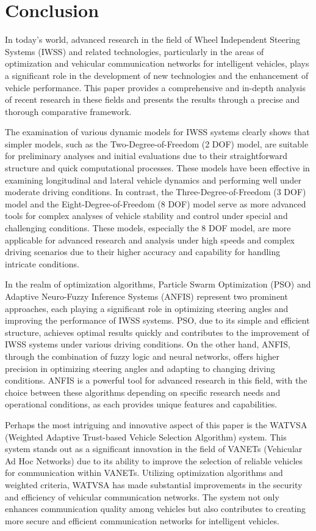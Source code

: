 \documentclass[a4paper,10pt]{article}
\begin{document}
    \section{Conclusion}

        In today's world, advanced research in the field of Wheel Independent Steering Systems (IWSS) and related technologies, particularly in the areas of optimization and vehicular communication networks for intelligent vehicles, plays a significant role in the development of new technologies and the enhancement of vehicle performance. This paper provides a comprehensive and in-depth analysis of recent research in these fields and presents the results through a precise and thorough comparative framework.

        The examination of various dynamic models for IWSS systems clearly shows that simpler models, such as the Two-Degree-of-Freedom (2 DOF) model, are suitable for preliminary analyses and initial evaluations due to their straightforward structure and quick computational processes. These models have been effective in examining longitudinal and lateral vehicle dynamics and performing well under moderate driving conditions. In contrast, the Three-Degree-of-Freedom (3 DOF) model and the Eight-Degree-of-Freedom (8 DOF) model serve as more advanced tools for complex analyses of vehicle stability and control under special and challenging conditions. These models, especially the 8 DOF model, are more applicable for advanced research and analysis under high speeds and complex driving scenarios due to their higher accuracy and capability for handling intricate conditions.
    
        In the realm of optimization algorithms, Particle Swarm Optimization (PSO) and Adaptive Neuro-Fuzzy Inference Systems (ANFIS) represent two prominent approaches, each playing a significant role in optimizing steering angles and improving the performance of IWSS systems. PSO, due to its simple and efficient structure, achieves optimal results quickly and contributes to the improvement of IWSS systems under various driving conditions. On the other hand, ANFIS, through the combination of fuzzy logic and neural networks, offers higher precision in optimizing steering angles and adapting to changing driving conditions. ANFIS is a powerful tool for advanced research in this field, with the choice between these algorithms depending on specific research needs and operational conditions, as each provides unique features and capabilities.
    
        Perhaps the most intriguing and innovative aspect of this paper is the WATVSA (Weighted Adaptive Trust-based Vehicle Selection Algorithm) system. This system stands out as a significant innovation in the field of VANETs (Vehicular Ad Hoc Networks) due to its ability to improve the selection of reliable vehicles for communication within VANETs. Utilizing optimization algorithms and weighted criteria, WATVSA has made substantial improvements in the security and efficiency of vehicular communication networks. The system not only enhances communication quality among vehicles but also contributes to creating more secure and efficient communication networks for intelligent vehicles.
    
\end{document}
